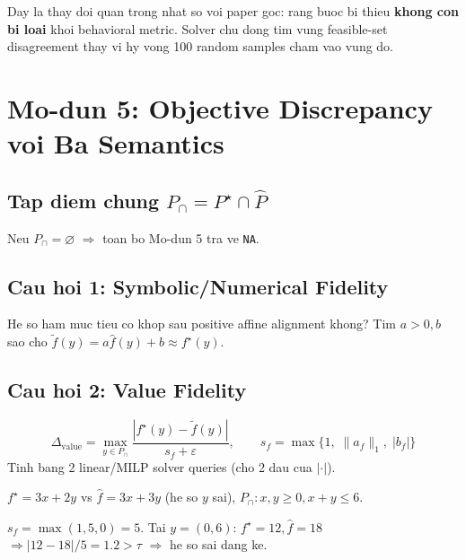 \documentclass[11pt,a4paper]{article}
\begin{document}
\begin{proposition}
Day la thay doi quan trong nhat so voi paper goc: rang buoc bi thieu
\textbf{khong con bi loai} khoi behavioral metric. Solver chu dong tim vung
feasible-set disagreement thay vi hy vong 100 random samples cham vao vung do.
\end{proposition}

\section{Mo-dun 5: Objective Discrepancy voi Ba Semantics}

\subsection{Tap diem chung $P_\cap = P^\star \cap \widehat{P}$}

Neu $P_\cap = \varnothing$ $\Rightarrow$ toan bo Mo-dun 5 tra ve \texttt{NA}.

\subsection{Cau hoi 1: Symbolic/Numerical Fidelity}

He so ham muc tieu co khop sau positive affine alignment khong?
Tim $a>0, b$ sao cho $\tilde{f}(y)=a\widehat{f}(y)+b \approx f^\star(y)$.

\subsection{Cau hoi 2: Value Fidelity}

\begin{keyformula}
\[
\Delta_{\mathrm{value}} = \max_{y \in P_\cap}
\frac{|f^\star(y) - \tilde{f}(y)|}{s_f + \varepsilon},
\qquad
s_f = \max\{1,\; \|a_f\|_1,\; |b_f|\}
\]
Tinh bang 2 linear/MILP solver queries (cho 2 dau cua $|\cdot|$).
\end{keyformula}

\begin{example}
$f^\star=3x+2y$ vs $\hat{f}=3x+3y$ (he so $y$ sai), $P_\cap: x,y\geq0, x+y\leq6$.

$s_f=\max(1,5,0)=5$. Tai $y=(0,6)$: $f^\star=12, \hat{f}=18$
$\Rightarrow |12-18|/5=1.2>\tau$ $\Rightarrow$ he so sai dang ke.
\end{example}
\end{document}
